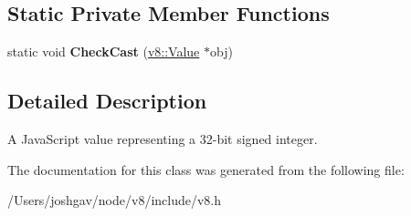 \subsection*{Static Private Member Functions}
\begin{DoxyCompactItemize}
\item 
static void {\bfseries Check\+Cast} (\hyperlink{classv8_1_1_value}{v8\+::\+Value} $\ast$obj)\hypertarget{classv8_1_1_int32_ae30a9627ce3288f38376a1d7252efda1}{}\label{classv8_1_1_int32_ae30a9627ce3288f38376a1d7252efda1}

\end{DoxyCompactItemize}


\subsection{Detailed Description}
A Java\+Script value representing a 32-\/bit signed integer. 

The documentation for this class was generated from the following file\+:\begin{DoxyCompactItemize}
\item 
/\+Users/joshgav/node/v8/include/v8.\+h\end{DoxyCompactItemize}
